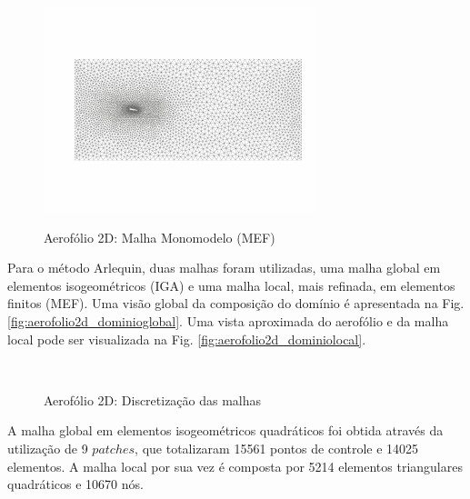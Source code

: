 \documentclass[tese_patricia]{subfiles}
\begin{document}
\begin{figure}[htb!]
	\centering 
	{\includegraphics[scale=2.5,trim=0cm 0.9cm 0cm 0.8cm, clip=true]{Imagens/Cap6/malhaMonoEstatica.pdf}}	
	\caption{Aerofólio 2D: Malha Monomodelo (MEF) }
	\label{fig:aerofolio2d_malhamonomodelomef}
\end{figure}


Para o método Arlequin, duas malhas foram utilizadas, uma malha global em elementos isogeométricos (IGA) e uma malha local, mais refinada, em elementos finitos (MEF). Uma visão global da composição do domínio é apresentada na Fig. \ref{fig:aerofolio2d_dominioglobal}. Uma vista aproximada do aerofólio e da malha local pode ser visualizada na Fig. \ref{fig:aerofolio2d_dominiolocal}.

\begin{figure}[!htb]
	\centering
	\\
	\caption{Aerofólio 2D: Discretização das malhas}
	\label{fig:aerofolio2d_malhasepatches}
\end{figure}

A malha global em elementos isogeométricos quadráticos foi obtida através da utilização de 9 $patches$, que totalizaram 15561 pontos de controle e 14025 elementos. A malha local por sua vez é composta por 5214 elementos triangulares quadráticos e 10670 nós. 
\end{document}
